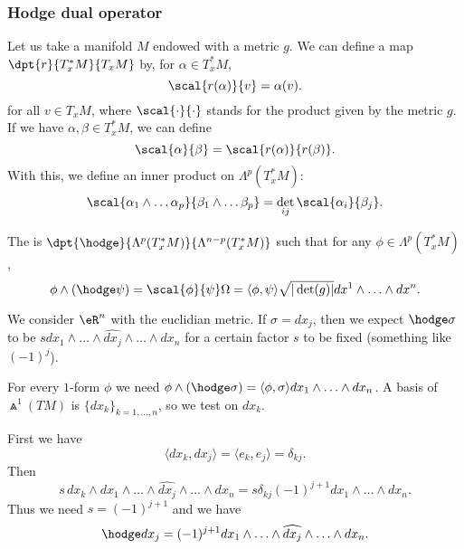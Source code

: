 \subsubsection{Hodge dual operator}
Let us take a manifold $M$ endowed with a metric $g$.  We can define a map $\dpt{r}{T^*_xM}{T_xM}$ by, for $\alpha\in T^*_xM$,
\[
	\scal{r(\alpha)}{v}=\alpha(v).
\]
for all $v\in T_xM$, where $\scal{\cdot}{\cdot}$ stands for the product given by the metric $g$. If we have $\alpha,\beta\in T^*_xM$, we can define
\[
	\scal{\alpha}{\beta}=\scal{r(\alpha)}{r(\beta)}.
\]
With this, we define an inner product on $\Lambda^p(T^*_xM)$:
\[
	\scal{\alpha_1\wedge\ldots\alpha_p}{\beta_1\wedge\ldots\beta_p}=\det_{ij}\scal{\alpha_i}{\beta_j}.
\]

\begin{definition}      \label{DEFooUOJQooSzKjNR}
	The  is $\dpt{\hodge}{\Lambda^p(T^*_xM)}{\Lambda^{n-p}(T^*_xM)}$ such that for any $\phi\in\Lambda^p(T^*_xM)$,
	\begin{equation}
		\phi\wedge(\hodge\psi)=\scal{\phi}{\psi}\Omega=\langle \phi,\psi \rangle\sqrt{|\det(g)|}dx^1\wedge\ldots\wedge dx^n.
	\end{equation}
\end{definition}

\begin{example} \label{EXooCIYIooFPMLMU}
	We consider \( \eR^n\) with the euclidian metric. If \( \sigma=dx_j\), then we expect \( \hodge\sigma\) to be \( sdx_1\wedge\ldots\wedge \widehat{dx_j}\wedge\ldots\wedge dx_n\) for a certain factor \( s\) to be fixed (something like \( (-1)^j\)).

	For every \( 1\)-form \( \phi\) we need \( \phi\wedge(\hodge \sigma)=\langle \phi, \sigma\rangle dx_1\wedge\ldots\wedge dx_n\). A basis of \( \Wedge^1(TM)\) is \( \{ dx_k \}_{k=1,\ldots, n}\), so we test on \( dx_k\).

	First we have
	\begin{equation}
		\langle dx_k, dx_j\rangle =\langle e_k, e_j\rangle =\delta_{kj}.
	\end{equation}
	Then
	\begin{equation}
		s\,dx_k\wedge dx_1\wedge\ldots\wedge \widehat{dx_j}\wedge\ldots\wedge dx_n=s\delta_{kj}(-1)^{j+1}dx_1\wedge\ldots\wedge dx_n.
	\end{equation}
	Thus we need \( s=(-1)^{j+1}\) and we have
	\begin{equation}
		\hodge dx_j=(-1)^{j+1}dx_1\wedge\ldots\wedge \widehat{dx_j}\wedge\ldots\wedge dx_n.
	\end{equation}
\end{example}


